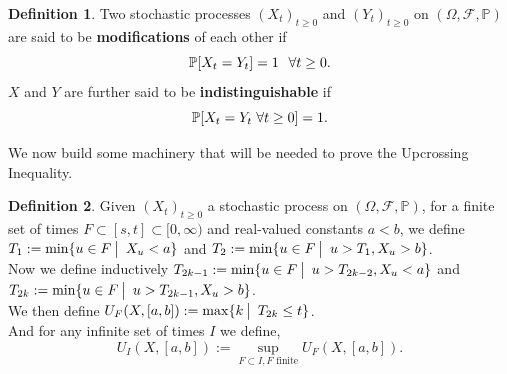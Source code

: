 \documentclass[12pt]{article}
\newcommand{\cF}{\mathcal{F}}
\newcommand{\Prb}{\mathbb{P}}
\newcommand{\quantifyspace}{\hspace{2px} \big | \hspace{5px}}
\newcommand{\PS}{(\Omega, \cF, \Prb)}
\newcommand{\spc}{\hspace{7 px}}
\newcommand{\sspc}{\hspace{3 px}}
\theoremstyle{definition}
\newtheorem{defn}{Definition}
\begin{document}
\begin{defn}
    Two stochastic processes $(X_t)_{t \geq 0}$ and $(Y_t)_{t \geq 0}$ on $\PS$ are said to be \textbf{modifications} of each other if
    \[
        \Prb[X_t = Y_t] = 1 \spc \forall t \geq 0.
    \]
    $X$ and $Y$ are further said to be \textbf{indistinguishable} if
    \[
        \Prb[X_t = Y_t \sspc \forall t \geq 0] = 1.
    \]
\end{defn}

We now build some machinery that will be needed to prove the Upcrossing Inequality.

\begin{defn}
    Given $(X_t)_{t \geq 0}$ a stochastic process on $\PS$, for a finite set of times $F \subset [s,t] \subset [0,\infty)$ and real-valued constants $a < b$,
    we define $T_1 := \min \{u \in F \quantifyspace X_u < a \}$ and $T_2 := \min \{u \in F \quantifyspace u > T_1, X_u > b\}$. \\
    Now we define inductively $T_{2k - 1} := \min \{u \in F \quantifyspace u > T_{2k - 2}, X_u < a\}$ and $T_{2k} := \min \{u \in F \quantifyspace  u > T_{2k-1}, X_u > b\}$. \\
    We then define $U_F (X, [a,b]) := \max \{k \quantifyspace T_{2k} \leq t\}$. \\
    And for any infinite set of times $I$ we define,
    \[
        U_I(X, [a,b]) := \sup_{F \subset I, F \text{ finite}} U_F(X, [a,b]).
    \]
\end{defn}
\end{document}
